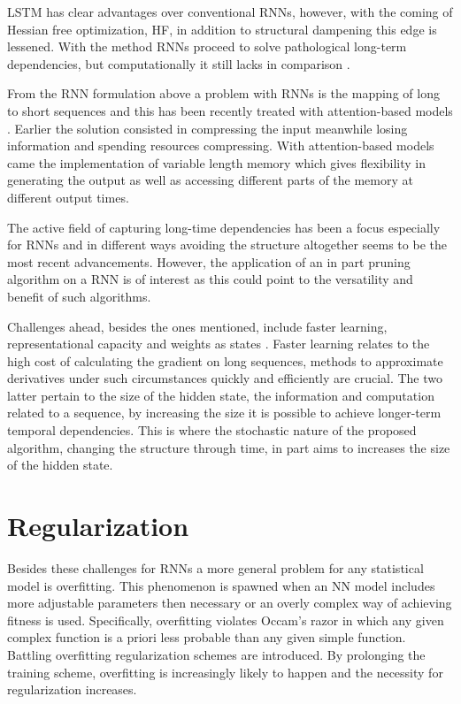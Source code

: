 LSTM has clear advantages over conventional RNNs, however, with the coming of Hessian free optimization, HF, in addition to structural dampening this edge is lessened. With the method RNNs proceed to solve pathological long-term dependencies, but computationally it still lacks in comparison \cite{suts}. 

From the RNN formulation above a problem with RNNs is the mapping of long to short sequences and this has been recently treated with attention-based models \cite{xu}. Earlier the solution consisted in compressing the input meanwhile losing information and spending resources compressing. With attention-based models came the implementation of variable length memory which gives flexibility in generating the output as well as accessing different parts of the memory at different output times. 

The active field of capturing long-time dependencies has been a focus especially for RNNs and in different ways avoiding the structure altogether seems to be the most recent advancements. However, the application of an in part pruning algorithm on a RNN is of interest as this could point to the versatility and benefit of such algorithms.

Challenges ahead, besides the ones mentioned, include faster learning, representational capacity and weights as states \cite{suts}. Faster learning relates to the high cost of calculating the gradient on long sequences, methods to approximate derivatives under such circumstances quickly and efficiently are crucial. The two latter pertain to the size of the hidden state, the information and computation related to a sequence, by increasing the size it is possible to achieve longer-term temporal dependencies. This is where the stochastic nature of the proposed algorithm, changing the structure through time, in part aims to increases the size of the hidden state.

\section{Regularization}

Besides these challenges for RNNs a more general problem for any statistical model is overfitting. This phenomenon is spawned when an NN model includes more adjustable parameters then necessary or an overly complex way of achieving fitness is used. Specifically, overfitting violates Occam's razor in which any given complex function is a priori less probable than any given simple function. Battling overfitting regularization schemes are introduced. By prolonging the training scheme, overfitting is increasingly likely to happen and the necessity for regularization increases.

